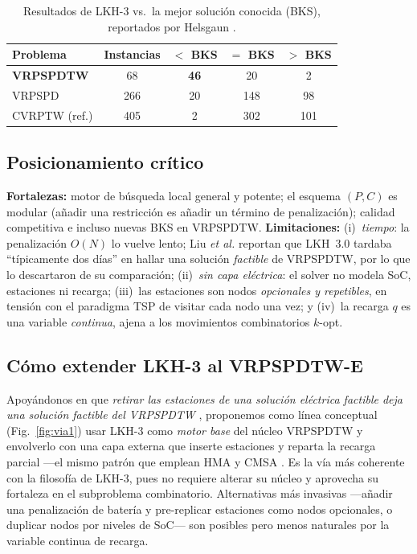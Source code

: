 \documentclass[conference]{IEEEtran}
\begin{document}
\begin{table}[t]
  \centering
  \caption{Resultados de LKH-3 vs.\ la mejor soluci\'on conocida (BKS),
  reportados por Helsgaun \cite{helsgaun2017lkh3}.}
  \label{tab:lkh}
  \renewcommand{\arraystretch}{1.15}
  \begin{tabular}{@{}lcccc@{}}
    \toprule
    Problema & Instancias & $<$ BKS & $=$ BKS & $>$ BKS \\
    \midrule
    \textbf{VRPSPDTW} & 68  & \textbf{46} & 20  & 2  \\
    VRPSPD            & 266 & 20          & 148 & 98 \\
    CVRPTW (ref.)     & 405 & 2           & 302 & 101 \\
    \bottomrule
  \end{tabular}
\end{table}

\subsection{Posicionamiento cr\'itico}
\textbf{Fortalezas:} motor de b\'usqueda local general y potente; el esquema
$(P,C)$ es modular (a\~nadir una restricci\'on es a\~nadir un t\'ermino de
penalizaci\'on); calidad competitiva e incluso nuevas BKS en VRPSPDTW.
\textbf{Limitaciones:} (i)~\emph{tiempo}: la penalizaci\'on $O(N)$ lo vuelve
lento; Liu \emph{et al.} \cite{liu2021mate} reportan que LKH~3.0 tardaba
``t\'ipicamente dos d\'ias'' en hallar una soluci\'on \emph{factible} de
VRPSPDTW, por lo que lo descartaron de su comparaci\'on; (ii)~\emph{sin capa
el\'ectrica}: el solver no modela SoC, estaciones ni recarga;
(iii)~las estaciones son nodos \emph{opcionales y repetibles}, en tensi\'on con
el paradigma TSP de visitar cada nodo una vez; y (iv)~la recarga $q$ es una
variable \emph{continua}, ajena a los movimientos combinatorios $k$-opt.

\subsection{C\'omo extender LKH-3 al VRPSPDTW-E}
Apoy\'andonos en que \emph{retirar las estaciones de una soluci\'on el\'ectrica
factible deja una soluci\'on factible del VRPSPDTW} \cite{zheng2025hma},
proponemos como l\'inea conceptual (Fig.~\ref{fig:via1}) usar LKH-3 como
\emph{motor base} del n\'ucleo VRPSPDTW y envolverlo con una capa externa que
inserte estaciones y reparta la recarga parcial ---el mismo patr\'on que emplean
HMA \cite{zheng2025hma} y CMSA \cite{akbay2022cmsa}. Es la v\'ia m\'as coherente
con la filosof\'ia de LKH-3, pues no requiere alterar su n\'ucleo y aprovecha su
fortaleza en el subproblema combinatorio. Alternativas m\'as invasivas ---a\~nadir
una penalizaci\'on de bater\'ia y pre-replicar estaciones como nodos opcionales,
o duplicar nodos por niveles de SoC--- son posibles pero menos naturales por la
variable continua de recarga.
\end{document}

